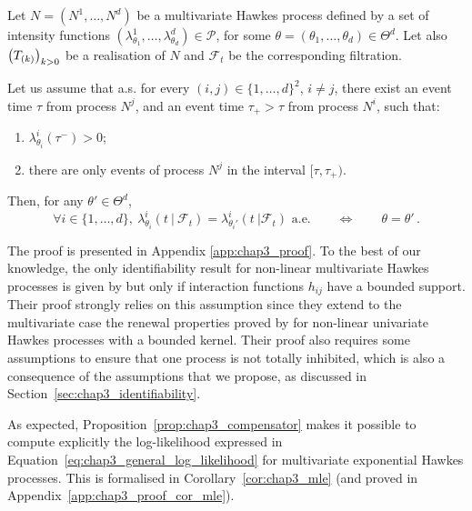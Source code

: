 \begin{theorem}[Identifiability]\label{th:chap3_identifiability}
    Let $N=(N^1, \ldots, N^d)$ be a multivariate Hawkes process defined by a set of intensity functions $(\lambda^1_{\theta_1}, \dots, \lambda^d_{\theta_d}) \in \mathcal P$, for some $\theta = (\theta_1, \dots, \theta_d) \in \Theta^d$.
    Let also $\left(T_{(k)} \right)_{k>0}$ be a realisation of $N$ and $\mathcal{F}_t$ be the corresponding filtration.
    
    Let us assume that a.s. for every $(i, j) \in \{1, \dots, d\}^2$, $i\neq j$,
    there exist an event time \(\tau\) from process \(N^j\),
    and an event time \(\tau_+ > \tau\) from process \(N^i\), such that:
    \begin{enumerate}
        \item \label{hyp:chap3_ii} $\lambda_{\theta_i}^i(\tau^-) > 0$;
        \item \label{hyp:chap3_iii} there are only events of process $N^j$ in the interval $[\tau, \tau_+)$.
    \end{enumerate} 
    
    Then, for any $\theta' \in \Theta^d$,
    \[
      \forall i \in \{1, \dots, d\},~
      \lambda_{\theta_i}^i(t ~|~ \mathcal{F}_t) = \lambda_{\theta_i'}^i(t ~| \mathcal{F}_t) \text{ a.e.}
      \qquad
      \iff
      \qquad
      \theta = \theta' \,.
    \]
\end{theorem}

The proof is presented in Appendix \ref{app:chap3_proof}. To the best of our knowledge, the only identifiability result for non-linear multivariate Hawkes processes is given by \textcite{Sulem2021} but only if interaction functions $h_{ij}$ have a bounded support. Their proof strongly relies on this assumption since they extend to the multivariate case the renewal properties proved by \textcite{Costa2020} for non-linear univariate Hawkes processes with a bounded kernel.
Their proof also requires some assumptions to ensure that one process is not totally inhibited, which is also a consequence of the assumptions that we propose, as discussed in Section~\ref{sec:chap3_identifiability}. 

    As expected, Proposition~\ref{prop:chap3_compensator} makes it possible to compute explicitly the log-likelihood expressed in Equation~\eqref{eq:chap3_general_log_likelihood} for multivariate exponential Hawkes processes.
    This is formalised in Corollary~\ref{cor:chap3_mle} (and proved in Appendix~\ref{app:chap3_proof_cor_mle}).


